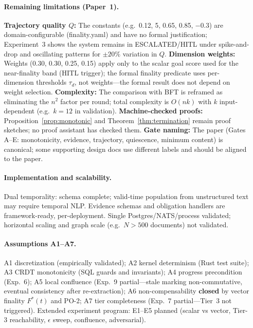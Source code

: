 \documentclass[11pt]{article}
\begin{document}
\paragraph{Remaining limitations (Paper~1).} \textbf{Trajectory quality $Q$:} The constants (e.g.\ 0.12, 5, 0.65, 0.85, $-0.3$) are domain-configurable (finality.yaml) and have no formal justification; Experiment~3 shows the system remains in ESCALATED/HITL under spike-and-drop and oscillating patterns for $\pm 20\%$ variation in $Q$. \textbf{Dimension weights:} Weights (0.30, 0.30, 0.25, 0.15) apply only to the scalar goal score used for the near-finality band (HITL trigger); the formal finality predicate uses per-dimension thresholds $\tau_d$, not weights---the formal result does not depend on weight selection. \textbf{Complexity:} The comparison with BFT is reframed as eliminating the $n^2$ factor per round; total complexity is $O(nk)$ with $k$ input-dependent (e.g.\ $k = 12$ in validation). \textbf{Machine-checked proofs:} Proposition~\ref{prop:monotonic} and Theorem~\ref{thm:termination} remain proof sketches; no proof assistant has checked them. \textbf{Gate naming:} The paper (Gates A--E: monotonicity, evidence, trajectory, quiescence, minimum content) is canonical; some supporting design docs use different labels and should be aligned to the paper.

\paragraph{Implementation and scalability.} Dual temporality: schema complete; valid-time population from unstructured text may require temporal NLP. Evidence schemas and obligation handlers are framework-ready, per-deployment. Single Postgres/NATS/process validated; horizontal scaling and graph scale (e.g.\ $N > 500$ documents) not validated.

\paragraph{Assumptions A1--A7.} A1 discretization (empirically validated); A2 kernel determinism (Rust test suite); A3 CRDT monotonicity (SQL guards and invariants); A4 progress precondition (Exp.~6); A5 local confluence (Exp.~9 partial---stale marking non-commutative, eventual consistency after re-extraction); A6 non-compensability \textbf{closed} by vector finality $F^*(t)$ and PO-2; A7 tier completeness (Exp.~7 partial---Tier~3 not triggered). Extended experiment program: E1--E5 planned (scalar vs vector, Tier-3 reachability, $\epsilon$ sweep, confluence, adversarial).
\end{document}
